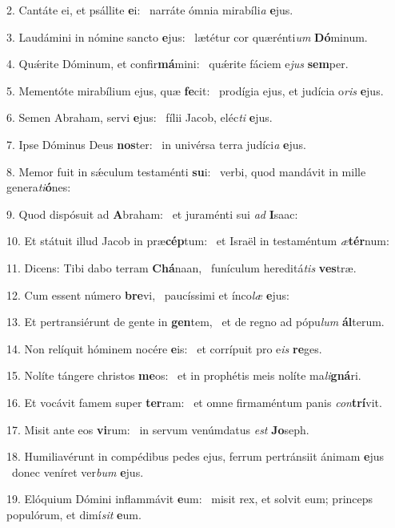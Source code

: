 2. Cantáte ei, et psállite \textbf{e}i: \ast\  narráte ómnia mirabíli\textit{a} \textbf{e}jus.\

3. Laudámini in nómine sancto \textbf{e}jus: \ast\  lætétur cor quærénti\textit{um} \textbf{Dó}minum.\

4. Quǽrite Dóminum, et confir\textbf{má}mini: \ast\  quǽrite fáciem e\textit{jus} \textbf{sem}per.\

5. Mementóte mirabílium ejus, quæ \textbf{fe}cit: \ast\  prodígia ejus, et judícia o\textit{ris} \textbf{e}jus.\

6. Semen Abraham, servi \textbf{e}jus: \ast\  fílii Jacob, eléc\textit{ti} \textbf{e}jus.\

7. Ipse Dóminus Deus \textbf{nos}ter: \ast\  in univérsa terra judíci\textit{a} \textbf{e}jus.\

8. Memor fuit in sǽculum testaménti \textbf{su}i: \ast\  verbi, quod mandávit in mille genera\textit{ti}\textbf{ó}nes:\

9. Quod dispósuit ad \textbf{A}braham: \ast\  et juraménti sui \textit{ad} \textbf{I}saac:\

10. Et státuit illud Jacob in præ\textbf{cép}tum: \ast\  et Israël in testaméntum \textit{æ}\textbf{tér}num:\

11. Dicens: Tibi dabo terram \textbf{Chá}naan, \ast\  funículum hereditá\textit{tis} \textbf{ves}træ.\

12. Cum essent número \textbf{bre}vi, \ast\  paucíssimi et ínco\textit{læ} \textbf{e}jus:\

13. Et pertransiérunt de gente in \textbf{gen}tem, \ast\  et de regno ad pópu\textit{lum} \textbf{ál}terum.\

14. Non relíquit hóminem nocére \textbf{e}is: \ast\  et corrípuit pro e\textit{is} \textbf{re}ges.\

15. Nolíte tángere christos \textbf{me}os: \ast\  et in prophétis meis nolíte ma\textit{li}\textbf{gná}ri.\

16. Et vocávit famem super \textbf{ter}ram: \ast\  et omne firmaméntum panis \textit{con}\textbf{trí}vit.\

17. Misit ante eos \textbf{vi}rum: \ast\  in servum venúmdatus \textit{est} \textbf{Jo}seph.\

18. Humiliavérunt in compédibus pedes ejus, ferrum pertránsiit ánimam \textbf{e}jus \ast\  donec veníret ver\textit{bum} \textbf{e}jus.\

19. Elóquium Dómini inflammávit \textbf{e}um: \ast\  misit rex, et solvit eum; princeps populórum, et dimí\textit{sit} \textbf{e}um.\

